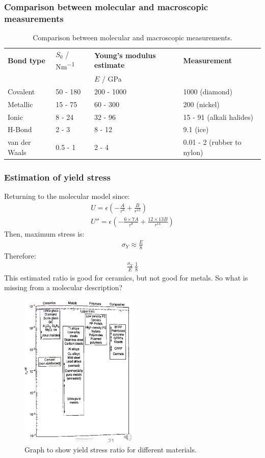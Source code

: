 \subsubsection{Comparison between molecular and macroscopic measurements}
\begin{table}[H]
	\centering
	\begin{tabular}{@{}llll@{}}
		\toprule
		\textbf{Bond type} & $S_0$ / \si{Nm^{-1}} & \textbf{Young's modulus estimate} & \textbf{Measurement}\\
		& & $E$ / \si{\giga\pascal} & \\
		\midrule
		Covalent & 50 - 180 & 200 - 1000 & 1000 (diamond)\\
		Metallic & 15 - 75 & 60 - 300 & 200 (nickel)\\
		Ionic & 8 - 24 & 32 - 96 & 15 - 91 (alkali halides)\\
		H-Bond & 2 - 3 & 8 - 12 & 9.1 (ice)\\
		van der Waals & 0.5 - 1 & 2 - 4 & 0.01 - 2 (rubber to nylon)
	\end{tabular}
	\caption{Comparison between molecular and macroscopic measurements.}
\end{table}
\subsubsection{Estimation of yield stress}
Returning to the molecular model since:
\begin{gather}
	U = \epsilon \left(-\frac{A}{r^6} + \frac{B}{r^{12}}\right)\\
	U'' = \epsilon \left(- \frac{6\times 7A}{r^8} + \frac{12\times 13B}{r^{14}}\right)
\end{gather}
Then, maximum stress is:
\begin{gather}
	\sigma_Y \approx \frac{E}{8}
\end{gather}
Therefore:
\begin{gather}
	\frac{\sigma_Y}{E} ~ \frac{1}{8}
\end{gather}
This estimated ratio is good for ceramics, but not good for metals. So what is missing from a molecular description?
\begin{figure}[H]
	\centering
	\includegraphics[width = 0.5\textwidth]{./img/figure13.png}
	\caption{Graph to show yield stress ratio for different materials.}
\end{figure}
